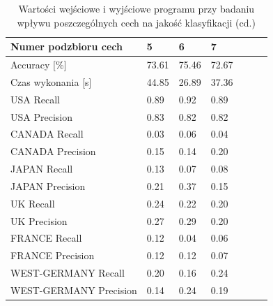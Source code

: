 \documentclass{classrep}
\begin{document}
{{            \begin{table}[!htbp]
                \centering
                \begin{tabular}{|l|l|l|l|l|l|l|}
                    \hline
                    Numer podzbioru cech   & 5     & 6     & 7     \\ \hline
                    Accuracy {[}\%{]}      & 73.61 & 75.46 & 72.67 \\ \hline
                    Czas wykonania {[}s{]} & 44.85 & 26.89 & 37.36 \\ \hline
                    USA Recall             & 0.89  & 0.92  & 0.89  \\ \hline
                    USA Precision          & 0.83  & 0.82  & 0.82  \\ \hline
                    CANADA Recall          & 0.03  & 0.06  & 0.04  \\ \hline
                    CANADA Precision       & 0.15  & 0.14  & 0.20  \\ \hline
                    JAPAN Recall           & 0.13  & 0.07  & 0.08  \\ \hline
                    JAPAN Precision        & 0.21  & 0.37  & 0.15  \\ \hline
                    UK Recall              & 0.24  & 0.22  & 0.20  \\ \hline
                    UK Precision           & 0.27  & 0.29  & 0.20  \\ \hline
                    FRANCE Recall          & 0.12  & 0.04  & 0.06  \\ \hline
                    FRANCE Precision       & 0.12  & 0.12  & 0.07  \\ \hline
                    WEST-GERMANY Recall    & 0.20  & 0.16  & 0.24  \\ \hline
                    WEST-GERMANY Precision & 0.14  & 0.24  & 0.19  \\ \hline
                \end{tabular}
                \caption{Wartości wejściowe i wyjściowe programu przy badaniu wpływu poszczególnych cech na jakość klasyfikacji (cd.)} \label{table-features2}
            \end{table}
            \FloatBarrier
        }
    }
\end{document}
